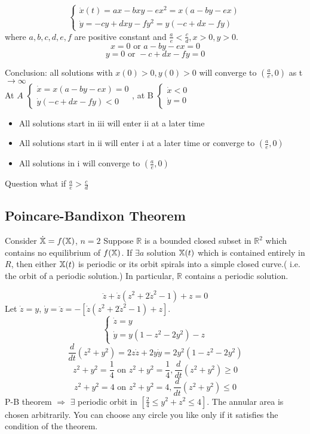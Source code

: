 \begin{example}
\[\begin{cases}
\dot{x}(t)=ax-bxy-ex^2=x(a-by-ex)\\
\dot{y}=-cy+dxy-fy^2=y(-c+dx-fy)
\end{cases}
\]
where $a, b, c, d, e, f$ are positive constant and $\frac{a}{e}<\frac{c}{d}, x>0, y>0$.
\[x=0 \text{ or } a-by-ex=0 
\]
\[y=0\text{ or } -c+dx-fy=0
\]

Conclusion: all solutions with $x(0)>0, y(0)>0$ will converge to $(\frac{a}{e},0)$ as t $\rightarrow\infty$\\
At $A$ $\begin{cases}\dot{x}=x(a-by-ex)=0\\\dot{y}(-c+dx-fy)<0\end{cases}$, at B $\begin{cases}\dot{x}<0\\\dot{y}=0\end{cases}$
\begin{itemize}
\item All solutions start in iii will enter ii at a later time 
\item All solutions start in ii will enter i at a later time or converge to $(\frac{a}{e},0)$
\item All solutions in i will converge to $(\frac{a}{e},0)$

\end{itemize}


Question what if $\frac{a}{e}>\frac{c}{d}$
\end{example}
\subsection{Poincare-Bandixon Theorem}
Consider $\dot{\mathbb{X}}=f(\mathbb{X})$, $n=2$ Suppose $\mathbb{R}$ is a bounded closed subset in $\mathbb{R}^2$ which contains no equilibrium of $f(\mathbb{X})$. If $\exists a $ solution $\mathbb{X}(t)$ which is contained entirely in $R$, then either $\mathbb{X}(t)$ is periodic or its orbit spirals into a simple closed curve.( i.e. the orbit of a periodic solution.) In particular, $\mathbb{R}$ contains a periodic solution.
\begin{example}
\[\ddot{z}+\dot{z}(z^2+2\dot{z}^2-1)+z=0
\]
Let $\dot{z}=y$, $\dot{y}=\ddot{z}=-[\dot{z}(z^2+2\dot{z}^2-1)+z]$.
\[\begin{cases}\dot{z}=y\\\dot{y}=y(1-z^2-2y^2)-z
\end{cases}
\]
\[\frac{d}{dt}(z^2+y^2)=2z\dot{z}+2y\dot{y}=2y^2(1-z^2-2y^2)
\]
\[z^2+y^2=\frac{1}{4}\text{ on } z^2+y^2=\frac{1}{4},\frac{d}{dt}(z^2+y^2)\geq0
\]
\[z^2+y^2=4\text{ on }z^2+y^2=4, \frac{d}{dt}(z^2+y^2)\leq0
\]
P-B theorem $\Rightarrow$ $\exists$ periodic orbit in $[\frac{2}{4}\leq y^2+z^2\leq4]$.
The annular area is chosen arbitrarily. You can choose any circle you like only if it satisfies the condition of the theorem.
\end{example}



